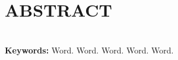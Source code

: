 \thispagestyle{pretext}

\section*{\centering ABSTRACT}

\lipsum[3] \\

\noindent\textbf{Keywords:} Word. Word. Word. Word. Word.

\newpage
